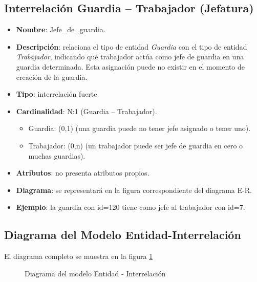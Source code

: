 \subsection{Interrelación Guardia -- Trabajador (Jefatura)}
\begin{itemize}
    \item \textbf{Nombre}: Jefe\_de\_guardia.
    \item \textbf{Descripción}: relaciona el tipo de entidad \textit{Guardia} con el tipo de entidad \textit{Trabajador},
    indicando qué trabajador actúa como jefe de guardia en una guardia determinada. Esta asignación puede no existir
    en el momento de creación de la guardia.
    \item \textbf{Tipo}: interrelación fuerte.
    \item \textbf{Cardinalidad}: N:1 (Guardia -- Trabajador).
    \begin{itemize}
        \item Guardia: (0,1) (una guardia puede no tener jefe asignado o tener uno).
        \item Trabajador: (0,n) (un trabajador puede ser jefe de guardia en cero o muchas guardias).
    \end{itemize}
    \item \textbf{Atributos}: no presenta atributos propios.
    \item \textbf{Diagrama}: se representará en la figura correspondiente del diagrama E-R.
    \item \textbf{Ejemplo}: la guardia con id=120 tiene como jefe al trabajador con id=7.
\end{itemize}


\begin{landscape}
\section{Diagrama del Modelo Entidad-Interrelación}\label{sec:diagrama-E-R}
El diagrama completo se muestra en la figura \ref{fig:EER_v5}
\begin{figure}[H]
    \centering
    \caption{Diagrama del modelo Entidad - Interrelación}
    \label{fig:EER_v5}
\end{figure}
\end{landscape}
